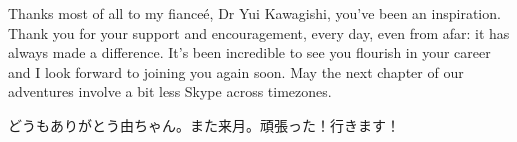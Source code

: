 Thanks most of all to my fiance\'{e}, Dr Yui Kawagishi, you've been an inspiration. Thank you for your support and encouragement, every day, even from afar: it has always made a difference. It’s been incredible to see you flourish in your career and I look forward to joining you again soon. May the next chapter of our adventures involve a bit less Skype across timezones.

\begin{CJK}{UTF8}{goth}どうもありがとう由ちゃん。また来月。頑張った！行きます！\end{CJK}
